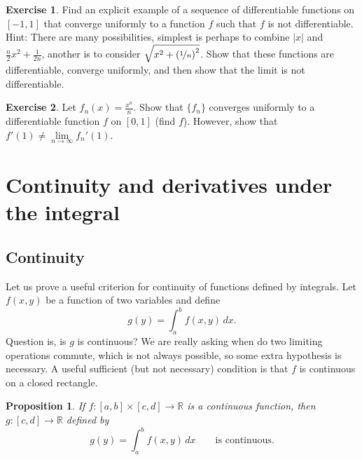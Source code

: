 \documentclass[12pt,openany]{book}
\newcommand{\abs}[1]{\left\lvert {#1} \right\rvert}
\newcommand{\R}{{\mathbb{R}}}
\theoremstyle{plain}
\newtheorem{prop}[thm]{Proposition}
\theoremstyle{remark}
\theoremstyle{definition}
\newenvironment{exbox}{%
    \def\FrameCommand{\vrule width 1pt \relax\hspace{10pt}}%
    \MakeFramed{\advance\hsize-\width\FrameRestore}%
}{%
    \endMakeFramed
}
\theoremstyle{exercise}
\newtheorem{exercise}{Exercise}[section]
\theoremstyle{example}
\begin{document}
\begin{exbox}
\begin{exercise}
Find an explicit example of a sequence of
differentiable functions on $[-1,1]$ that converge uniformly to
a function $f$ such that $f$ is not differentiable.
Hint:
There are many possibilities,
simplest is perhaps to combine $\abs{x}$ and $\frac{n}{2}x^2 +
\frac{1}{2n}$, another is to
consider $\sqrt{x^2+{(\nicefrac{1}{n})}^2}$.  Show that these functions are differentiable,
converge uniformly, and then show that the limit is not differentiable.
\end{exercise}

\begin{exercise}
Let $f_n(x) = \frac{x^n}{n}$.  Show that $\{ f_n \}$ converges uniformly to
a differentiable function $f$ on $[0,1]$ (find $f$).  However, show that
$f'(1) \not= \lim\limits_{n\to\infty} f_n'(1)$.
\end{exercise}
\end{exbox}


\section{Continuity and derivatives under the integral}
\label{sec:contlimitsunderint}

\subsection{Continuity}

Let us prove a useful criterion for
continuity of functions defined by integrals.  Let $f(x,y)$ be a function of two variables and define
\begin{equation*}
g(y) = \int_a^b f(x,y) \,dx .
\end{equation*}
Question is, is $g$ is continuous?
We are really asking when do two limiting operations commute,
which is not always possible, so some extra hypothesis
is necessary.  A useful sufficient (but not
necessary) condition is that $f$ is continuous on a closed rectangle.

\begin{prop} \label{prop:integralcontcont}
If $f \colon [a,b] \times [c,d] \to \R$ is a continuous function,
then $g \colon [c,d] \to \R$ defined by
\begin{equation*}
g(y) = \int_a^b f(x,y) \,dx  \qquad \text{is continuous}.
\end{equation*}
\end{prop}
\end{document}
